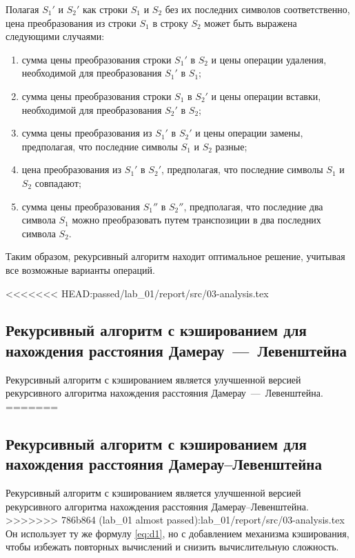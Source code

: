 Полагая $S_{1}'$ и $S_{2}'$ как строки $S_{1}$ и $S_{2}$ без их последних символов соответственно, цена преобразования из строки $S_{1}$ в строку $S_{2}$ может быть выражена следующими случаями:
\begin{enumerate}
   \item сумма цены преобразования строки $S_{1}'$ в $S_{2}$ и цены операции удаления, необходимой для преобразования $S_{1}'$ в $S_{1}$;
   \item сумма цены преобразования строки $S_{1}$ в $S_{2}'$ и цены операции вставки, необходимой для преобразования $S_{2}'$ в $S_{2}$;
   \item сумма цены преобразования из $S_{1}'$ в $S_{2}'$ и цены операции замены, предполагая, что последние символы $S_{1}$ и $S_{2}$ разные;
   \item цена преобразования из $S_{1}'$ в $S_{2}'$, предполагая, что последние символы $S_{1}$ и $S_{2}$ совпадают;
   \item сумма цены преобразования $S_{1}''$ в $S_{2}''$, предполагая, что последние два символа $S_{1}$ можно преобразовать путем транспозиции в два последних символа $S_{2}$.
\end{enumerate}

Таким образом, рекурсивный алгоритм находит оптимальное решение, учитывая все возможные варианты операций.

<<<<<<< HEAD:passed/lab_01/report/src/03-analysis.tex
\subsection{Рекурсивный алгоритм с кэшированием для нахождения расстояния Дамерау~---~Левенштейна}

Рекурсивный алгоритм с кэшированием является улучшенной версией рекурсивного алгоритма нахождения расстояния Дамерау~---~Левенштейна. 
=======
\subsection{Рекурсивный алгоритм с кэшированием для нахождения расстояния Дамерау--Левенштейна}

Рекурсивный алгоритм с кэшированием является улучшенной версией рекурсивного алгоритма нахождения расстояния Дамерау--Левенштейна. 
>>>>>>> 786b864 (lab_01 almost passed):lab_01/report/src/03-analysis.tex
Он использует ту же формулу \ref{eq:d1}, но с добавлением механизма кэширования, чтобы избежать повторных вычислений и снизить вычислительную сложность.

